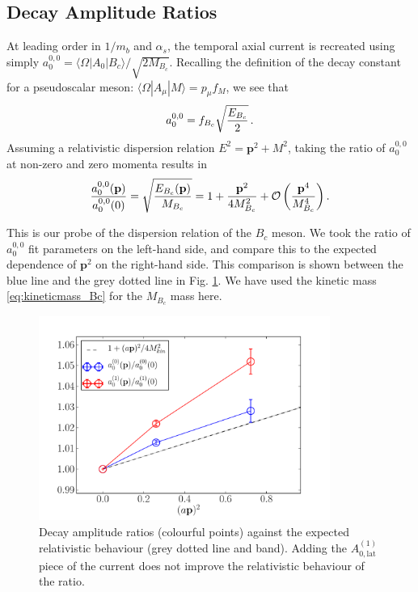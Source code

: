 \subsection{Decay Amplitude Ratios}

At leading order in $1/m_b$ and $\alpha_s$, the temporal axial current is recreated using simply $a_0^{0,0} = \langle \Omega | A_0 | B_c \rangle /\sqrt{2M_{B_c}}$. Recalling the definition of the decay constant for a pseudoscalar meson: $\langle \Omega | A_{\mu} | M \rangle = p_{\mu} f_{M}$, we see that
\begin{align}
  a_0^{0,0} = f_{B_c}\sqrt{ E_{B_c} \over 2 }\,.
\end{align}
Assuming a relativistic dispersion relation $E^2={\textbf{p}}^2+M^2$, taking the ratio of $a_0^{0,0}$ at non-zero and zero momenta results in
\begin{align}
  {a_0^{0,0}({\textbf{p}})\over a_0^{0,0}(0)} = \sqrt{ E_{B_c}({\textbf{p}})\over M_{B_c}} = 1 + {{\textbf{p}}^2\over 4M_{B_c}^2} + \mathcal{O}\left( {\textbf{p}}^4\over M_{B_c}^4 \right).
\end{align}

This is our probe of the dispersion relation of the $B_c$ meson. We took the ratio of $a_0^{0,0}$ fit parameters on the left-hand side, and compare this to the expected dependence of ${\textbf{p}}^2$ on the right-hand side. This comparison is shown between the blue line and the grey dotted line in Fig. \ref{fig:relativisticnorm}. We have used the kinetic mass \eqref{eq:kineticmass_Bc} for the $M_{B_c}$ mass here.

\begin{figure}[htp!]
  \begin{center}
    \includegraphics[width=0.85\textwidth]{images/nrqcd/relativistic_normalization_J0J1.pdf}
  \end{center}
  \caption{Decay amplitude ratios (colourful points) against the expected relativistic behaviour (grey dotted line and band). Adding the $A_{0,\text{lat}}^{(1)}$ piece of the current does not improve the relativistic behaviour of the ratio. \label{fig:relativisticnorm}}
\end{figure}

